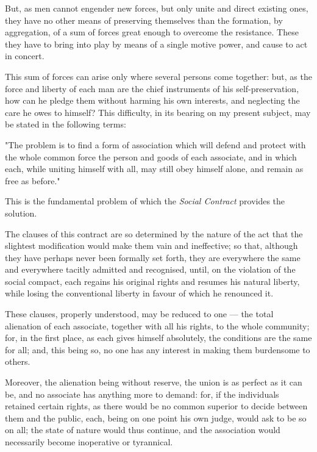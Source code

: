 \documentclass[12pt]{book}
\begin{document}
But, as men cannot engender new forces, but only unite and direct existing ones, they have no other means of preserving themselves than the formation, by aggregation, of a sum of forces great enough to overcome the resistance. These they have to bring into play by means of a single motive power, and cause to act in concert.

This sum of forces can arise only where several persons come together: but, as the force and liberty of each man are the chief instruments of his self-preservation, how can he pledge them without harming his own interests, and neglecting the care he owes to himself? This difficulty, in its bearing on my present subject, may be stated in the following terms:\begin{displayquote}
"The problem is to find a form of association which will defend and protect with the whole common force the person and goods of each associate, and in which each, while uniting himself with all, may still obey himself alone, and remain as free as before."
\end{displayquote} This is the fundamental problem of which the \textit{Social Contract} provides the solution.

The clauses of this contract are so determined by the nature of the act that the slightest modification would make them vain and ineffective; so that, although they have perhaps never been formally set forth, they are everywhere the same and everywhere tacitly admitted and recognised, until, on the violation of the social compact, each regains his original rights and resumes his natural liberty, while losing the conventional liberty in favour of which he renounced it.

These clauses, properly understood, may be reduced to one — the total alienation of each associate, together with all his rights, to the whole community; for, in the first place, as each gives himself absolutely, the conditions are the same for all; and, this being so, no one has any interest in making them burdensome to others.

Moreover, the alienation being without reserve, the union is as perfect as it can be, and no associate has anything more to demand: for, if the individuals retained certain rights, as there would be no common superior to decide between them and the public, each, being on one point his own judge, would ask to be so on all; the state of nature would thus continue, and the association would necessarily become inoperative or tyrannical.
\end{document}
